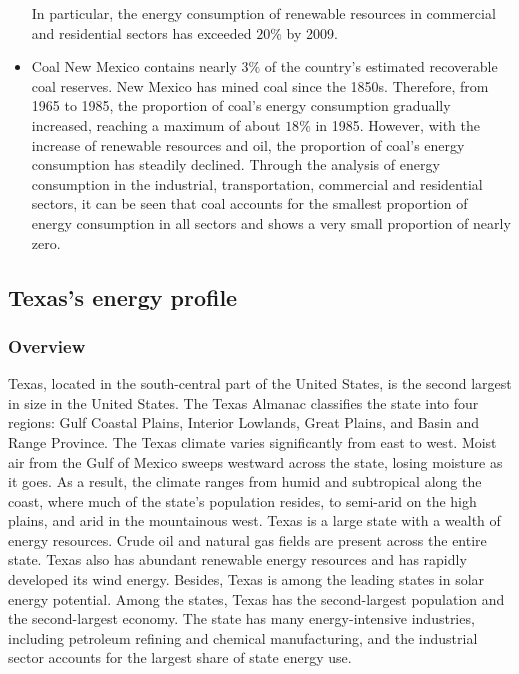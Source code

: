 \documentclass{mcmthesis}
\begin{document}
\begin{itemize}
  In particular, the energy consumption of renewable resources in commercial and residential sectors has exceeded $20\%$ by 2009.
  \item Coal
  New Mexico contains nearly $3\%$ of the country's estimated recoverable coal reserves. New Mexico has mined coal since the 1850s.
  Therefore, from 1965 to 1985, the proportion of coal's energy consumption gradually increased, reaching a maximum of about $18\%$ in 1985.
  However, with the increase of renewable resources and oil, the proportion of coal's energy consumption has steadily declined.
  Through the analysis of energy consumption in the industrial, transportation, commercial and residential sectors,
  it can be seen that coal accounts for the smallest proportion of energy consumption in all sectors and shows a very small proportion of nearly zero.
\end{itemize}
\subsection{Texas's energy profile}
\subsubsection{Overview}
Texas, located in the south-central part of the United States, is the second largest in size in the United States. The Texas Almanac classifies the state into four regions: Gulf Coastal Plains, Interior Lowlands, Great Plains, and Basin and Range Province. The Texas climate varies significantly from east to west. Moist air from the Gulf of Mexico sweeps westward across the state, losing moisture as it goes. As a result, the climate ranges from humid and subtropical along the coast, where much of the state's population resides, to semi-arid on the high plains, and arid in the mountainous west. Texas is a large state with a wealth of energy resources. Crude oil and natural gas fields are present across the entire state. Texas also has abundant renewable energy resources and has rapidly developed its wind energy. Besides, Texas is among the leading states in solar energy potential. Among the states, Texas has the second-largest population and the second-largest economy. The state has many energy-intensive industries, including petroleum refining and chemical manufacturing, and the industrial sector accounts for the largest share of state energy use.
\end{document}
